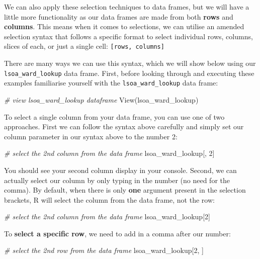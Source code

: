 \documentclass[
]{book}
\newenvironment{Shaded}{\begin{snugshade}}{\end{snugshade}}
\newcommand{\CommentTok}[1]{\textcolor[rgb]{0.56,0.35,0.01}{\textit{#1}}}
\newcommand{\DecValTok}[1]{\textcolor[rgb]{0.00,0.00,0.81}{#1}}
\newcommand{\FunctionTok}[1]{\textcolor[rgb]{0.00,0.00,0.00}{#1}}
\newcommand{\NormalTok}[1]{#1}
\begin{document}
We can also apply these selection techniques to data frames, but we will have a little more functionality as our data frames are made from both \textbf{rows} and \textbf{columns}. This means when it comes to selections, we can utilise an amended selection syntax that follows a specific format to select individual rows, columns, slices of each, or just a single cell: \texttt{{[}rows,\ columns{]}}

There are many ways we can use this syntax, which we will show below using our \texttt{lsoa\_ward\_lookup} data frame. First, before looking through and executing these examples familiarise yourself with the \texttt{lsoa\_ward\_lookup} data frame:

\begin{Shaded}
\begin{Highlighting}[]
\CommentTok{\# view lsoa\_ward\_lookup dataframe}
\FunctionTok{View}\NormalTok{(lsoa\_ward\_lookup)}
\end{Highlighting}
\end{Shaded}

To select a single column from your data frame, you can use one of two approaches. First we can follow the syntax above carefully and simply set our column parameter in our syntax above to the number 2:

\begin{Shaded}
\begin{Highlighting}[]
\CommentTok{\# select the 2nd column from the data frame}
\NormalTok{lsoa\_ward\_lookup[, }\DecValTok{2}\NormalTok{]}
\end{Highlighting}
\end{Shaded}

You should see your second column display in your console. Second, we can actually select our column by only typing in the number (no need for the comma). By default, when there is only \textbf{one} argument present in the selection brackets, R will select the column from the data frame, not the row:

\begin{Shaded}
\begin{Highlighting}[]
\CommentTok{\# select the 2nd column from the data frame}
\NormalTok{lsoa\_ward\_lookup[}\DecValTok{2}\NormalTok{]}
\end{Highlighting}
\end{Shaded}

To \textbf{select a specific row}, we need to add in a comma after our number:

\begin{Shaded}
\begin{Highlighting}[]
\CommentTok{\# select the 2nd row from the data frame}
\NormalTok{lsoa\_ward\_lookup[}\DecValTok{2}\NormalTok{, ]}
\end{Highlighting}
\end{Shaded}
\end{document}

